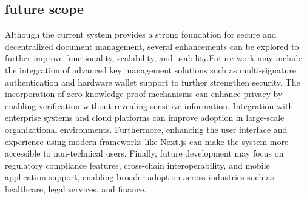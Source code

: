 \documentclass[12pt]{article}
\begin{document}
\subsection{future scope}
Although the current system provides a strong foundation for secure and decentralized document management, several enhancements can be explored to further improve functionality, scalability, and usability.Future work may include the integration of advanced key management solutions such as multi-signature authentication and hardware wallet support to further strengthen security. The incorporation of zero-knowledge proof mechanisms can enhance privacy by enabling verification without revealing sensitive information. Integration with enterprise systems and cloud platforms can improve adoption in large-scale organizational environments. Furthermore, enhancing the user interface and experience using modern frameworks like Next.js can make the system more accessible to non-technical users. Finally, future development may focus on regulatory compliance features, cross-chain interoperability, and mobile application support, enabling broader adoption across industries such as healthcare, legal services, and finance.











\newpage



\end{document}
